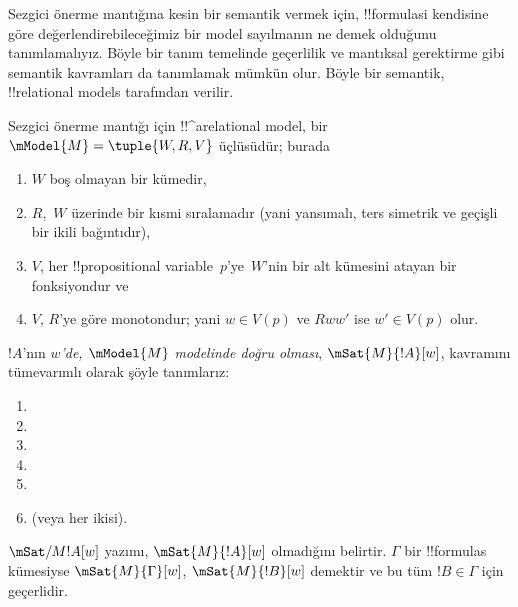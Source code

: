 



Sezgici önerme mantığına kesin bir semantik vermek için, !!{formula}s{}i
kendisine göre değerlendirebileceğimiz bir model sayılmanın ne demek olduğunu
tanımlamalıyız. Böyle bir tanım temelinde geçerlilik ve mantıksal gerektirme
gibi semantik kavramları da tanımlamak mümkün olur. Böyle bir semantik,
!!{relational model}s tarafından verilir.

\begin{defn}
  Sezgici önerme mantığı için !!^a{relational model}, bir
  $\mModel{M} = \tuple{W, R, V}$ üçlüsüdür; burada
  \begin{enumerate}
  \item $W$ boş olmayan bir kümedir,
  \item $R$,~$W$ üzerinde bir kısmi sıralamadır (yani yansımalı, ters simetrik
    ve geçişli bir ikili bağıntıdır),
  \item $V$, her !!{propositional
    variable}~$p$'ye~$W$'nin bir alt kümesini
    atayan bir fonksiyondur ve
  \item $V$, $R$'ye göre monotondur; yani $w \in V(p)$ ve $Rww'$ ise
    $w' \in V(p)$ olur.
  \end{enumerate}
\end{defn}

\begin{defn}
  $!A$'nın \emph{$w$'de, $\mModel{M}$ modelinde doğru olması},
  $\mSat{M}{!A}[w]$, kavramını tümevarımlı olarak şöyle tanımlarız:
  \begin{enumerate}
  \item {}
  \item {}
  \item {}
  \item {}
  \item {}
  \item {} (veya her ikisi).
  \end{enumerate}
  $\mSat/{M}{!A}[w]$ yazımı, $\mSat{M}{!A}[w]$ olmadığını belirtir. $\Gamma$
  bir !!{formula}s kümesiyse $\mSat{M}{\Gamma}[w]$, $\mSat{M}{!B}[w]$
  demektir ve bu tüm $!B \in \Gamma$ için geçerlidir.
\end{defn}

